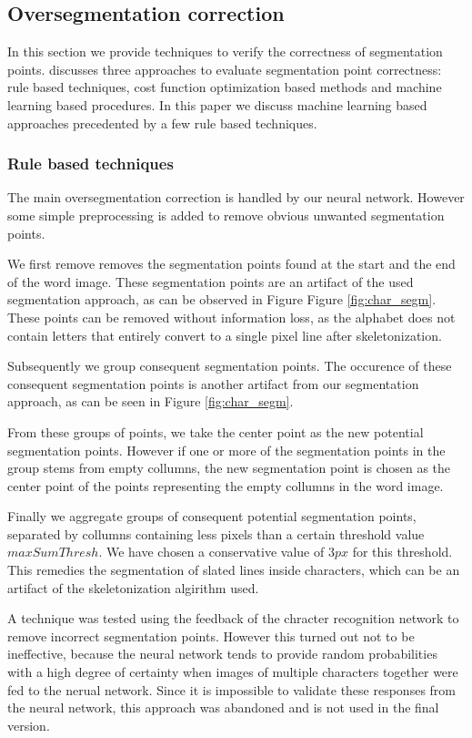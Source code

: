 \documentclass{article}
\begin{document}
\subsection{Oversegmentation correction}
In this section we provide techniques to verify the correctness of segmentation points.
\cite{evalsplitpoints} discusses three approaches to evaluate segmentation point correctness: rule based techniques, cost function optimization based methods and machine learning based procedures.
In this paper we discuss machine learning based approaches precedented by a few rule based techniques.

\subsubsection{Rule based techniques}
The main oversegmentation correction is handled by our neural network.
However some simple preprocessing is added to remove obvious unwanted segmentation points.

We first remove removes the segmentation points found at the start and the end of the word image.
These segmentation points are an artifact of the used segmentation approach, as can be observed in Figure Figure \ref{fig:char_segm}.
These points can be removed without information loss, as the alphabet does not contain letters that entirely convert to a single pixel line after skeletonization.

Subsequently we group consequent segmentation points.
The occurence of these consequent segmentation points is another artifact from our segmentation approach, as can be seen in Figure \ref{fig:char_segm}.

From these groups of points, we take the center point as the new potential segmentation points.
However if one or more of the segmentation points in the group stems from empty collumns, the new segmentation point is chosen as the center point of the points representing the empty collumns in the word image.

Finally we aggregate groups of consequent potential segmentation points, separated by collumns containing less pixels than a certain threshold value $maxSumThresh$.
We have chosen a conservative value of $3px$ for this threshold.
This remedies the segmentation of slated lines inside characters, which can be an artifact of the skeletonization algirithm used.

A technique was tested using the feedback of the chracter recognition network to remove incorrect segmentation points.
However this turned out not to be ineffective, because the neural network tends to provide random probabilities with a high degree of certainty when images of multiple characters together were fed to the nerual network.
Since it is impossible to validate these responses from the neural network, this approach was abandoned and is not used in the final version.
\end{document}
